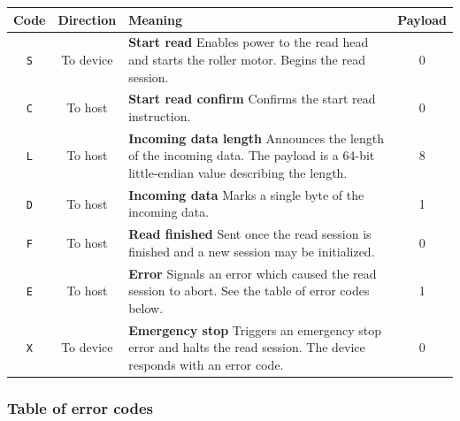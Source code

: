 \documentclass{article}
\begin{document}
	\begin{center}
	\begin{tabular}{ |c|c|p{7cm}|c| }
		\hline
			Code & Direction & Meaning & Payload \\
		\hline
			\texttt{S} &
			To device &
			\textbf{Start read}\newline
			Enables power to the read head and starts the roller motor. Begins
			the read session.
			& 0 \\
		\hline
			\texttt{C} &
			To host &
			\textbf{Start read confirm}\newline
			Confirms the start read instruction.
			& 0 \\
		\hline
			\texttt{L} &
			To host &
			\textbf{Incoming data length}\newline
			Announces the length of the incoming data. The payload is a 64-bit
			little-endian value describing the length.
			& 8 \\
		\hline
			\texttt{D} &
			To host &
			\textbf{Incoming data}\newline
			Marks a single byte of the incoming data.
			& 1 \\
		\hline
			\texttt{F} &
			To host &
			\textbf{Read finished}\newline
			Sent once the read session is finished and a new session may be
			initialized.
			& 0 \\
		\hline
			\texttt{E} &
			To host &
			\textbf{Error}\newline
			Signals an error which caused the read session to abort. See the
			table of error codes below.
			& 1 \\
		\hline
			\texttt{X} &
			To device &
			\textbf{Emergency stop}\newline
			Triggers an emergency stop error and halts the read session. The
			device responds with an error code.
			& 0 \\
		\hline
	\end{tabular}
	\end{center}
	
	\subsubsection{Table of error codes}
	
\end{document}

